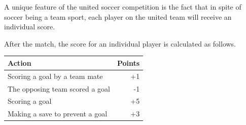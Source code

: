 \documentclass[12pt]{hurocup}
\begin{document}
\begin{lawlist}[US]

\item A unique feature of the united soccer competition is the fact
  that in spite of soccer being a team sport, each player on the
  united team will receive an individual score.

\item After the match, the score for an individual player is
  calculated as follows. 

  \begin{center}
    \begin{tabular}{|l|r|}
      \hline
      Action & Points \\
      \hline
      Scoring a goal by a team mate   & +1\\
      The opposing team scored a goal & -1\\
      Scoring a goal                  & +5\\
      Making a save to prevent a goal & +3\\
      \hline
    \end{tabular}
  \end{center}

\end{lawlist}

\end{document}
